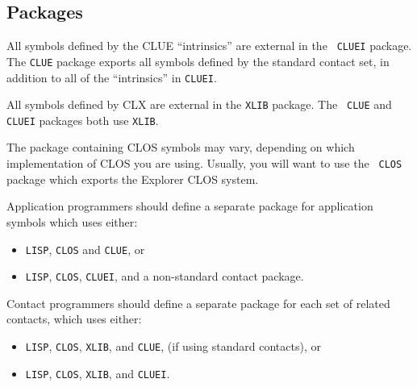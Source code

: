      
  
\subsection{Packages}
All symbols defined by the CLUE ``intrinsics'' are external in the {\tt
CLUEI} package.  The {\tt CLUE} package exports all symbols defined by the
standard contact set, 
in addition to all of the
``intrinsics'' in {\tt CLUEI}\footnotemark{}.

All symbols defined by CLX are external in the {\tt XLIB} package. The {\tt
CLUE} and {\tt CLUEI} packages both use {\tt XLIB}.

The package containing CLOS symbols may vary, depending on which
implementation of CLOS you are using. Usually, you will want to use the {\tt
CLOS} package which exports the Explorer CLOS system. 

\begin{center}
 \end{center}


Application programmers should define a separate package for application symbols
which uses either:
\begin{itemize}
\item {\tt LISP}, {\tt CLOS} and {\tt CLUE}, or
\item {\tt LISP}, {\tt CLOS}, {\tt CLUEI}, and a non-standard contact package.
\end{itemize}

Contact programmers should define a separate package for each set of
related contacts, which uses either: 
\begin{itemize}
\item {\tt LISP}, {\tt CLOS}, {\tt XLIB}, and {\tt CLUE}, (if using standard
contacts), or 
\item {\tt LISP}, {\tt CLOS}, {\tt XLIB}, and {\tt CLUEI}.
\end{itemize}

